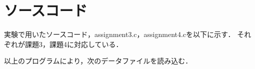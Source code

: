 
\section{ソースコード}
実験で用いたソースコード，assignment3.c，assignment4.cを以下に示す．
それぞれが課題3，課題4に対応している．


以上のプログラムにより，次のデータファイルを読み込む．

